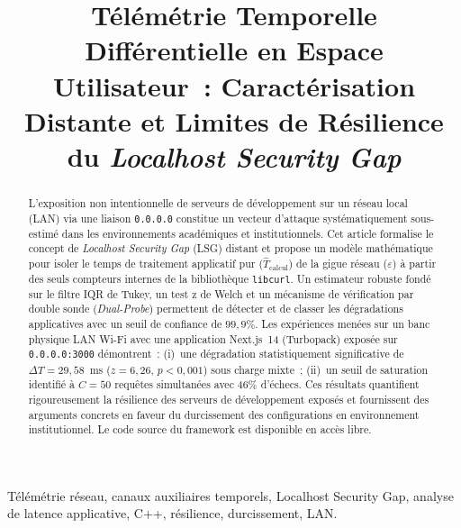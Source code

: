 \documentclass[10pt,conference,compsoc]{IEEEtran}
\begin{document}
\title{Télémétrie Temporelle Différentielle en Espace Utilisateur~:
Caractérisation Distante et Limites de Résilience du \textit{Localhost Security Gap}}

\author{
}

\maketitle

\begin{abstract}
L'exposition non intentionnelle de serveurs de développement sur un
réseau local (LAN) via une liaison \texttt{0.0.0.0} constitue un vecteur
d'attaque systématiquement sous-estimé dans les environnements
académiques et institutionnels. Cet article formalise le concept de
\textit{Localhost Security Gap} (LSG) distant et propose un modèle
mathématique pour isoler le temps de traitement applicatif pur
($\hat{T}_{\mathrm{calcul}}$) de la gigue réseau ($\varepsilon$) à
partir des seuls compteurs internes de la bibliothèque \texttt{libcurl}.
Un estimateur robuste fondé sur le filtre IQR de Tukey, un test z de
Welch et un mécanisme de vérification par double sonde (\textit{Dual-Probe})
permettent de détecter et de classer les dégradations applicatives avec
un seuil de confiance de $99{,}9\%$. Les expériences menées sur un banc
physique LAN Wi-Fi avec une application Next.js~14 (Turbopack) exposée
sur \texttt{0.0.0.0:3000} démontrent~: (i)~une dégradation statistiquement
significative de $\Delta T = 29{,}58$~ms ($z = 6{,}26$, $p < 0{,}001$)
sous charge mixte~; (ii)~un seuil de saturation identifié à $C = 50$
requêtes simultanées avec 46\% d'échecs. Ces résultats quantifient
rigoureusement la résilience des serveurs de développement exposés et
fournissent des arguments concrets en faveur du durcissement des
configurations en environnement institutionnel. Le code source du
framework est disponible en accès libre.
\end{abstract}

\begin{IEEEkeywords}
Télémétrie réseau, canaux auxiliaires temporels, Localhost Security Gap,
analyse de latence applicative, C++, résilience, durcissement, LAN.
\end{IEEEkeywords}
\end{document}
